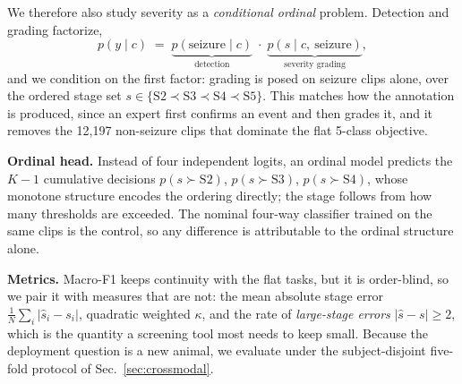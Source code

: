 We therefore also study severity as a \emph{conditional ordinal} problem. Detection
and grading factorize,
\begin{equation}
p(y \mid c) \;=\; \underbrace{p(\text{seizure} \mid c)}_{\text{detection}}
\;\cdot\;
\underbrace{p(s \mid c,\ \text{seizure})}_{\text{severity grading}},
\label{eq:conditional}
\end{equation}
and we condition on the first factor: grading is posed on seizure clips alone, over
the ordered stage set $s\in\{\mathrm{S2}\prec\mathrm{S3}\prec\mathrm{S4}\prec
\mathrm{S5}\}$. This matches how the annotation is produced, since an expert
first confirms an event and then grades it, and it removes the 12{,}197 non-seizure clips
that dominate the flat 5-class objective.

\noindent\textbf{Ordinal head.}
Instead of four independent logits, an ordinal model predicts the $K{-}1$ cumulative
decisions $p(s \succ \mathrm{S2})$, $p(s \succ \mathrm{S3})$, $p(s \succ
\mathrm{S4})$, whose monotone structure encodes the ordering directly; the stage
follows from how many thresholds are exceeded. The nominal four-way classifier
trained on the same clips is the control, so any difference is attributable to the
ordinal structure alone.

\noindent\textbf{Metrics.}
Macro-F1 keeps continuity with the flat tasks, but it is order-blind, so we pair it
with measures that are not: the mean absolute stage error
$\frac{1}{N}\sum_i|\hat{s}_i-s_i|$, quadratic weighted $\kappa$, and the rate of
\emph{large-stage errors} $|\hat{s}-s|\ge 2$, which is the quantity a screening tool
most needs to keep small. Because the deployment question is a new animal, we
evaluate under the subject-disjoint five-fold protocol of
Sec.~\ref{sec:crossmodal}.
